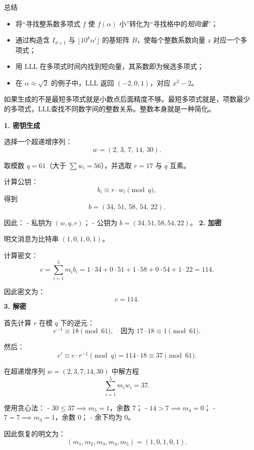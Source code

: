 {总结}
\begin{itemize}
  \item 将“寻找整系数多项式 \(f\) 使 \(f(\alpha)\) 小”转化为“寻找格中的\emph{短向量}”；
  \item 通过构造含 \(I_{d+1}\) 与 \(\lfloor10^k\alpha^i\rfloor\) 的基矩阵 \(B\)，使每个整数系数向量 \(z\) 对应一个多项式；
  \item 用 LLL 在多项式时间内找到短向量，其系数即为候选多项式；
  \item 在 \(\alpha\approx\sqrt2\) 的例子中，LLL 返回 \((-2,0,1)\)，对应 \(x^2-2\)。
\end{itemize}

如果生成的不是最短多项式就是小数点后面精度不够。最短多项式就是，项数最少的多项式，LLL查找不同数字间的整数关系。整数本身就是一种简化。
\begin{example}

\textbf{1. 密钥生成}  

选择一个超递增序列：
\[
w = (2,\,3,\,7,\,14,\,30).
\]

取模数 $q=61$（大于 $\sum w_i=56$），并选取 $r=17$ 与 $q$ 互素。  

计算公钥：
\[
b_i \equiv r \cdot w_i \pmod q,
\]
得到
\[
b=(34,\,51,\,58,\,54,\,22).
\]

因此：  
- 私钥为 $(w,q,r)$；  
- 公钥为 $b=(34,51,58,54,22)$。  
\textbf{2. 加密}  

明文消息为比特串 $(1,0,1,0,1)$。  

计算密文：
\[
c = \sum_{i=1}^5 m_i b_i = 1\cdot34 + 0\cdot51 + 1\cdot58 + 0\cdot54 + 1\cdot22 = 114.
\]

因此密文为：
\[
c=114.
\]
\textbf{3. 解密}  

首先计算 $r$ 在模 $q$ 下的逆元：
\[
r^{-1} \equiv 18 \pmod{61}, \quad \text{因为 } 17\cdot18 \equiv 1 \pmod{61}.
\]

然后：
\[
c' \equiv c \cdot r^{-1} \pmod q = 114 \cdot 18 \equiv 37 \pmod{61}.
\]

在超递增序列 $w=(2,3,7,14,30)$ 中解方程
\[
\sum_{i=1}^5 m_i w_i = 37.
\]

使用贪心法：  
- $30 \leq 37 \implies m_5=1$，余数 $7$；  
- $14>7 \implies m_4=0$；  
- $7=7 \implies m_3=1$，余数 $0$；  
- 余下均为 $0$。  

因此恢复的明文为：
\[
(m_1,m_2,m_3,m_4,m_5) = (1,0,1,0,1).
\]

\end{example}

